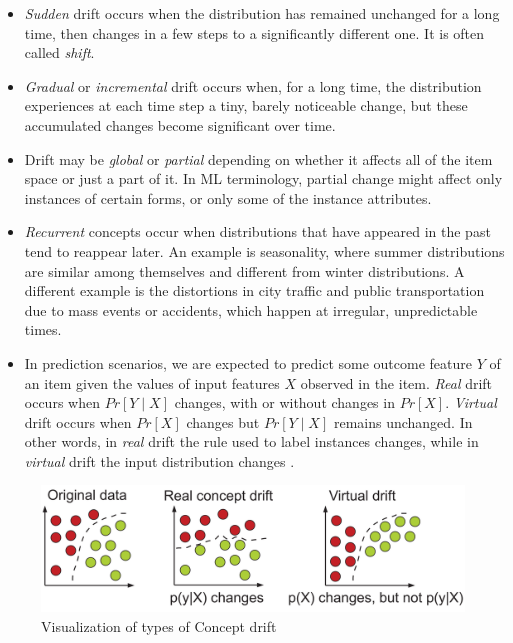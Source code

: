 \documentclass[12pt,oneside,a4paper,parskip]{scrbook}
\begin{document}
\begin{itemize}
  \item \textit{Sudden} drift occurs when the distribution has remained unchanged for a long time, then changes in a few steps to a significantly different one. It is often called \textit{shift}.
  \item \textit{Gradual} or \textit{incremental} drift occurs when, for a long time, the distribution experiences at each time step a tiny, barely noticeable change, but these accumulated changes become significant over time.
  \item Drift may be \textit{global} or \textit{partial} depending on whether it affects all of the item space or just a part of it. In ML terminology, partial change might affect only instances of certain forms, or only some of the instance attributes.
  \item \textit{Recurrent} concepts occur when distributions that have appeared in the past tend to reappear later. An example is seasonality, where summer distributions are similar among themselves and different from winter distributions. A different example is the distortions in city traffic and public transportation due to mass events or accidents, which happen at irregular, unpredictable times.
  \item In prediction scenarios, we are expected to predict some outcome feature $Y$ of an item given the values of input features $X$ observed in the item. \textit{Real} drift occurs when $Pr[Y\mid X]$ changes, with or without changes in $Pr[X]$. \textit{Virtual} drift occurs when $Pr[X]$ changes but $Pr[Y\mid X]$ remains unchanged. In other words, in \textit{real} drift the rule used to label instances changes, while in \textit{virtual} drift the input distribution changes \cite{MLonDataStreams}.
\end{itemize}

\begin{figure}[H]
  \centering
  \includegraphics[width=\columnwidth]{Concept_1}
  \caption{Visualization of types of Concept drift \cite{ConceptDrift}} 
  \label{fig:concept_1}
\end{figure}
\end{document}
